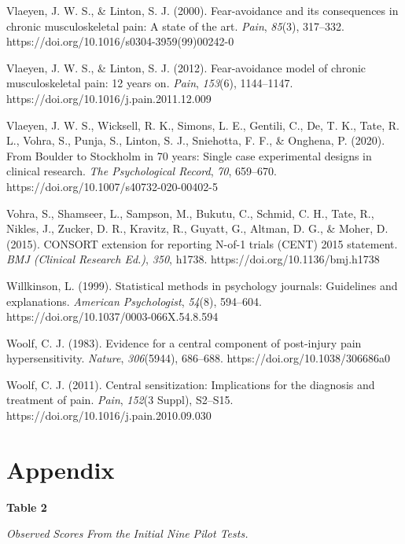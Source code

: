 \documentclass{article}
\begin{document}
Vlaeyen, J. W. S., \& Linton, S. J. (2000). Fear-avoidance and its consequences in chronic musculoskeletal pain: A state of the art. \emph{Pain}, \emph{85}(3), 317--332. https://doi.org/10.1016/s0304-3959(99)00242-0

Vlaeyen, J. W. S., \& Linton, S. J. (2012). Fear-avoidance model of chronic musculoskeletal pain: 12 years on. \emph{Pain}, \emph{153}(6), 1144--1147. https://doi.org/10.1016/j.pain.2011.12.009

Vlaeyen, J. W. S., Wicksell, R. K., Simons, L. E., Gentili, C., De, T. K., Tate, R. L., Vohra, S., Punja, S., Linton, S. J., Sniehotta, F. F., \& Onghena, P. (2020). From Boulder to Stockholm in 70 years: Single case experimental designs in clinical research. \emph{The Psychological Record}, \emph{70}, 659--670. https://doi.org/10.1007/s40732-020-00402-5

Vohra, S., Shamseer, L., Sampson, M., Bukutu, C., Schmid, C. H., Tate, R., Nikles, J., Zucker, D. R., Kravitz, R., Guyatt, G., Altman, D. G., \& Moher, D. (2015). CONSORT extension for reporting N-of-1 trials (CENT) 2015 statement. \emph{BMJ (Clinical Research Ed.)}, \emph{350}, h1738. https://doi.org/10.1136/bmj.h1738

Willkinson, L. (1999). Statistical methods in psychology journals: Guidelines and explanations. \emph{American Psychologist}, \emph{54}(8), 594--604. https://doi.org/10.1037/0003-066X.54.8.594

Woolf, C. J. (1983). Evidence for a central component of post-injury pain hypersensitivity. \emph{Nature}, \emph{306}(5944), 686--688. https://doi.org/10.1038/306686a0

Woolf, C. J. (2011). Central sensitization: Implications for the diagnosis and treatment of pain. \emph{Pain}, \emph{152}(3 Suppl), S2--S15. https://doi.org/10.1016/j.pain.2010.09.030





\section{Appendix}

\textbf{Table 2}

\emph{Observed }\emph{Scores }\emph{From}\emph{ the}\emph{ }\emph{Initial Nine}\emph{ Pilot Tests.}
\end{document}
